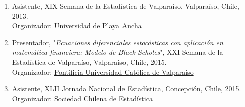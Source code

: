 \documentclass[10pt,a4paper]{article}
\begin{document}


\begin{enumerate}
\item Asistente, XIX Semana de la Estadística de Valparaíso, Valparaíso, Chile, 2013. \\ Organizador:  \href{http://www.upla.cl}{Universidad de Playa Ancha}
\item Presentador, "\textit{Ecuaciones diferenciales estocásticas con aplicación en matemática financiera: Modelo de Black-Scholes}", XXI Semana de la Estadística de Valparaíso, Valparaíso, Chile, 2015. \\ Organizador: \href{http://www.pucv.cl}{Pontificia Universidad Católica de Valparaíso}
\item Asistente, XLII Jornada Nacional de Estadística, Concepción, Chile, 2015. \\
Organizador:  \href{http://www.soche.cl}{Sociedad Chilena de Estadística}
\end{enumerate}
\end{document}

